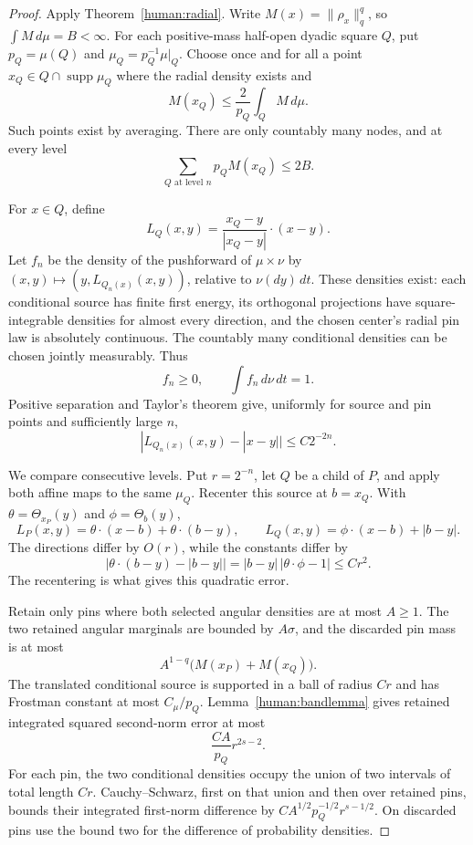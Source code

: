 \begin{proof}
Apply Theorem~\ref{human:radial}. Write
\(M(x)=\|\rho_x\|_q^q\), so \(\int M\,d\mu=B<\infty\).
For each positive-mass half-open dyadic square \(Q\), put
\(p_Q=\mu(Q)\) and \(\mu_Q=p_Q^{-1}\mu|_Q\). Choose once and
for all a point \(x_Q\in Q\cap\operatorname{supp}\mu_Q\) where the
radial density exists and
\begin{equation}\label{human:center-choice}
 M(x_Q)\le\frac2{p_Q}\int_Q M\,d\mu.
\end{equation}
Such points exist by averaging. There are only countably many nodes,
and at every level
\begin{equation}\label{human:center-sum}
 \sum_{Q\text{ at level }n}p_QM(x_Q)\le2B.
\end{equation}

For \(x\in Q\), define
\[
 L_Q(x,y)=\frac{x_Q-y}{|x_Q-y|}\cdot(x-y).
\]
Let \(f_n\) be the density of the pushforward of \(\mu\times\nu\)
by \((x,y)\mapsto(y,L_{Q_n(x)}(x,y))\), relative to
\(\nu(dy)\,dt\). These densities exist: each conditional source has
finite first energy, its orthogonal projections have square-integrable
densities for almost every direction, and the chosen center's radial
pin law is absolutely continuous. The countably many conditional
densities can be chosen jointly measurably. Thus
\[
 f_n\ge0,\qquad\int f_n\,d\nu\,dt=1.
\]
Positive separation and Taylor's theorem give, uniformly for source
and pin points and sufficiently large \(n\),
\begin{equation}\label{human:affine-error}
 |L_{Q_n(x)}(x,y)-|x-y||\le C2^{-2n}.
\end{equation}

We compare consecutive levels. Put \(r=2^{-n}\), let \(Q\) be a
child of \(P\), and apply both affine maps to the same \(\mu_Q\).
Recenter this source at \(b=x_Q\). With
\(\theta=\Theta_{x_P}(y)\) and \(\phi=\Theta_b(y)\),
\[
 L_P(x,y)=\theta\cdot(x-b)+\theta\cdot(b-y),\qquad
 L_Q(x,y)=\phi\cdot(x-b)+|b-y|.
\]
The directions differ by \(O(r)\), while the constants differ by
\begin{equation}\label{human:quadratic-shift}
 |\theta\cdot(b-y)-|b-y||
 =|b-y|\,|\theta\cdot\phi-1|\le Cr^2.
\end{equation}
The recentering is what gives this quadratic error.

Retain only pins where both selected angular densities are at most
\(A\ge1\). The two retained angular marginals are bounded by
\(A\sigma\), and the discarded pin mass is at most
\[
 A^{1-q}\bigl(M(x_P)+M(x_Q)\bigr).
\]
The translated conditional source is supported in a ball of radius
\(Cr\) and has Frostman constant at most \(C_\mu/p_Q\).
Lemma~\ref{human:bandlemma} gives retained integrated squared
second-norm error at most
\[
 \frac{CA}{p_Q}r^{2s-2}.
\]
For each pin, the two conditional densities occupy the union of two
intervals of total length \(Cr\). Cauchy--Schwarz, first on that
union and then over retained pins, bounds their integrated first-norm
difference by \(CA^{1/2}p_Q^{-1/2}r^{s-1/2}\).
On discarded pins use the bound two for the difference of probability
densities.


\end{proof}
